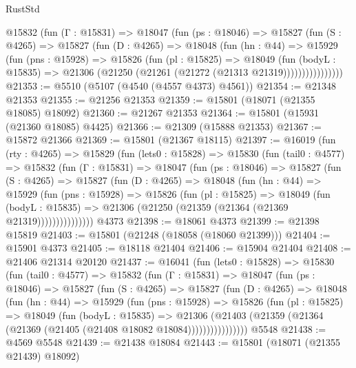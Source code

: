 \begin{lexlean}{RustStd}
\begin{coremodule}
          @15832
            (fun (Γ : @15831) =>
            @18047
              (fun (ps : @18046) =>
              @15827
                (fun (S : @4265) =>
                @15827
                  (fun (D : @4265) =>
                  @18048
                    (fun (hn : @44) =>
                    @15929
                      (fun (pns : @15928) =>
                      @15826
                        (fun (pl : @15825) =>
                        @18049
                          (fun (bodyL : @15835) =>
                          @21306 (@21250 (@21261 (@21272 (@21313 @21319))))))))))))))))
@21353 := @5510 (@5107 (@4540 (@4557 @4373) @4561))
@21354 := @21348 @21353
@21355 := @21256 @21353
@21359 := @15801 (@18071 (@21355 @18085) @18092)
@21360 := @21267 @21353
@21364 := @15801 (@15931 (@21360 @18085) @4425)
@21366 := @21309 (@15888 @21353)
@21367 := @15872 @21366
@21369 := @15801 (@21367 @18115)
@21397 := @16019
    (fun (rty : @4265) =>
    @15829
      (fun (lets0 : @15828) =>
      @15830
        (fun (tail0 : @4577) =>
        @15832
          (fun (Γ : @15831) =>
          @18047
            (fun (ps : @18046) =>
            @15827
              (fun (S : @4265) =>
              @15827
                (fun (D : @4265) =>
                @18048
                  (fun (hn : @44) =>
                  @15929
                    (fun (pns : @15928) =>
                    @15826
                      (fun (pl : @15825) =>
                      @18049
                        (fun (bodyL : @15835) =>
                        @21306 (@21250 (@21359 (@21364 (@21369 @21319)))))))))))))))
    @4373
@21398 := @18061 @4373
@21399 := @21398 @15819
@21403 := @15801 (@21248 (@18058 (@18060 @21399)))
@21404 := @15901 @4373
@21405 := @18118 @21404
@21406 := @15904 @21404
@21408 := @21406 @21314 @20120
@21437 := @16041
    (fun (lets0 : @15828) =>
    @15830
      (fun (tail0 : @4577) =>
      @15832
        (fun (Γ : @15831) =>
        @18047
          (fun (ps : @18046) =>
          @15827
            (fun (S : @4265) =>
            @15827
              (fun (D : @4265) =>
              @18048
                (fun (hn : @44) =>
                @15929
                  (fun (pns : @15928) =>
                  @15826
                    (fun (pl : @15825) =>
                    @18049
                      (fun (bodyL : @15835) =>
                      @21306
                        (@21403
                          (@21359 (@21364 (@21369 (@21405 (@21408 @18082 @18084))))))))))))))))
    @5548
@21438 := @4569 @5548
@21439 := @21438 @18084
@21443 := @15801 (@18071 (@21355 @21439) @18092)

\end{coremodule}
\end{lexlean}
